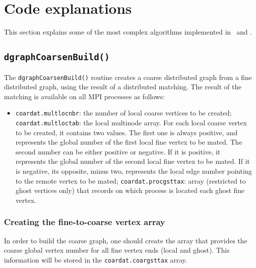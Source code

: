 
\section{Code explanations}
\label{sec-code}

This section explains some of the most complex algorithms implemented
in \scotch\ and \ptscotch.

\subsection{\texttt{dgraphCoarsenBuild()}}

The \texttt{dgraphCoarsenBuild()} routine creates a coarse distributed
graph from a fine distributed graph, using the result of a distributed
matching. The result of the matching is available on all MPI processes
as follows:
\begin{itemize}
\item
  \texttt{coardat.\lbt multlocnbr}: the number of local coarse
  vertices to be created;
  \texttt{coardat.\lbt multloctab}: the local multinode array. For each
  local coarse vertex to be created, it contains two values. The first
  one is always positive, and represents the global number of the first
  local fine vertex to be mated. The second number can be either
  positive or negative. If it is positive, it represents the global
  number of the second local fine vertex to be mated. If it is
  negative, its opposite, minus two, represents the local edge number
  pointing to the remote vertex to be mated;
  \texttt{coardat.\lbt procgsttax}: array (restricted to ghost
  vertices only) that records on which process is located each ghost
  fine vertex.
\end{itemize}

\subsubsection{Creating the fine-to-coarse vertex array}

In order to build the coarse graph, one should create the array that
provides the coarse global vertex number for all fine vertex ends
(local and ghost). This information will be stored in the
\texttt{coardat.\lbt coargsttax} array.

